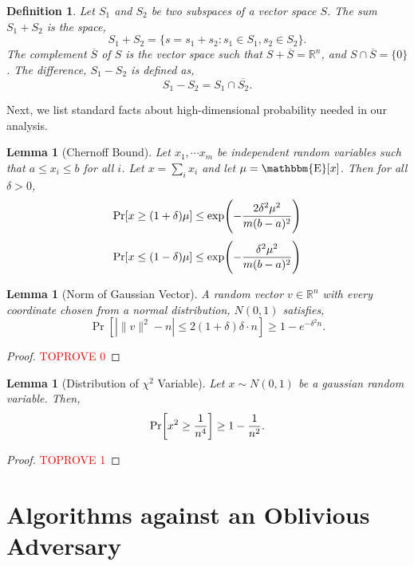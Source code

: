 \documentclass[11pt]{article}
\newtheorem{lemma}[theorem]{Lemma}
\newtheorem{definition}[theorem]{Definition}
\DeclareMathOperator*{\av}{\mathbbm{E}}
\let\originalleft\left
\let\originalright\right
\renewcommand{\left}{\mathopen{}\mathclose\bgroup\originalleft}
\renewcommand{\right}{\aftergroup\egroup\originalright}
\newcommand\vv{\boldsymbol{\mathit{v}}}
\begin{document}
\begin{definition}\label{def:subspace}Let $S_1$ and $S_2$ be two subspaces of a vector space $S$. The sum $S_1+S_2$ is the space,
\[
S_1+S_2 = \{s=s_1+s_2: s_1\in S_1, s_2 \in S_2\}.
\]
The complement $\overline{S}$ of $S$ is the vector space such that $S+\overline{S} = \mathbb{R}^n$, and $S\cap \overline{S} = \{0\}$. The difference, $S_1-S_2$ is defined as,
\[
S_1-S_2 = S_1\cap \overline{S_2}.
\]
\end{definition}

Next, we list standard facts about high-dimensional probability needed in our analysis.

\begin{lemma}[Chernoff Bound]\label{lem:Bernstein} Let $x_1,\cdots x_m$ be independent random variables such that $a\leq x_i\leq b$ for all $i$. Let $x = \sum_i x_i$ and let $\mu = \av[x]$. Then for all $\delta>0$,
\[
\Pr[x\geq(1+ \delta) \mu] \leq \exp \left(- \frac{2\delta^2\mu^2 }{m(b-a)^2} \right)
\]
\[
\Pr[x \leq (1-\delta) \mu] \leq \exp \left(- \frac{\delta^2\mu^2 }{m(b-a)^2} \right)
\]
\end{lemma}

\begin{lemma}[Norm of Gaussian Vector]\label{lem:NormG}
A random vector $\vv \in \mathbb{R}^n$ with every coordinate chosen from a normal distribution, $N(0,1)$ satisfies,
\[
\Pr[|\|\vv\|^2- n| \leq 2(1+\delta)\delta\cdot n ] \geq 1- e^{-\delta^2  n}.
\]
\end{lemma}
\begin{proof}\textcolor{red}{TOPROVE 0}\end{proof}

\begin{lemma}[Distribution of $\chi^2$ Variable]\label{lem:chi}
Let $x\sim N(0,1)$ be a gaussian random variable. Then,
\[
\Pr\left[x^2\geq \frac{1}{n^4}\right] \geq 1- \frac{1}{n^{2}}.
\]
\end{lemma}
\begin{proof}\textcolor{red}{TOPROVE 1}\end{proof}


 	


\section{Algorithms against an Oblivious Adversary}\label{sec:Obl}
\end{document}
